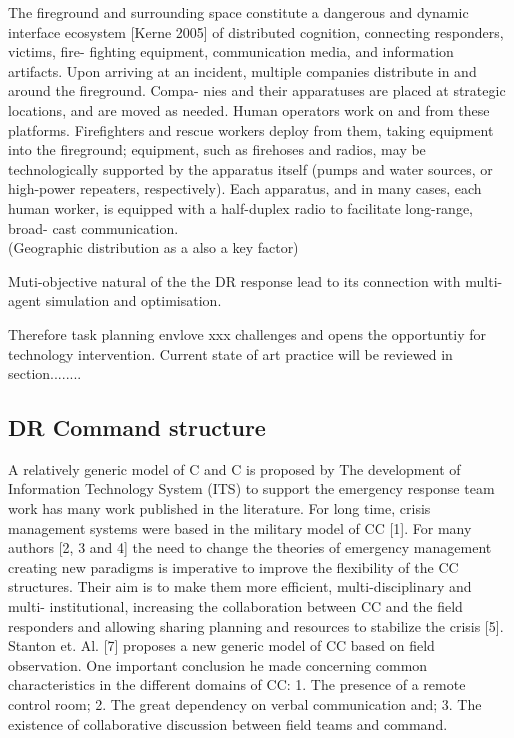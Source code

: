 The fireground and surrounding space constitute a dangerous and dynamic interface ecosystem [Kerne 2005] of distributed cognition, connecting responders, victims, fire- fighting equipment, communication media, and information artifacts. Upon arriving at an incident, multiple companies distribute in and around the fireground. Compa- nies and their apparatuses are placed at strategic locations, and are moved as needed. Human operators work on and from these platforms. Firefighters and rescue workers deploy from them, taking equipment into the fireground; equipment, such as firehoses and radios, may be technologically supported by the apparatus itself (pumps and water sources, or high-power repeaters, respectively). Each apparatus, and in many cases, each human worker, is equipped with a half-duplex radio to facilitate long-range, broad- cast communication.\\

(Geographic distribution as a also a key factor)

\noindent Muti-objective natural of the the DR response lead to its connection with multi-agent simulation and optimisation. 

Therefore task planning envlove xxx challenges and opens the opportuntiy for technology intervention. Current state of art practice will be reviewed in section........\\

\subsection{DR Command structure}


A relatively generic model of C and C is proposed by 
The development of Information Technology System (ITS)
to support the emergency response team work has many work published in the literature. For long time, crisis management systems were based in the military model of CC [1]. For many authors [2, 3 and 4] the need to change the theories of emergency management creating new paradigms is imperative to improve the flexibility of the CC structures. Their aim is to make them more
efficient, multi-disciplinary and multi-
institutional, increasing the collaboration between CC and the field responders and allowing sharing planning and resources to stabilize the crisis [5].
Stanton et. Al. [7] proposes a new generic model of CC
based on field observation. One important conclusion he made concerning common characteristics in the different domains of CC:
1. The presence of a remote control room; 2. The great dependency on verbal communication and;
3. The existence of collaborative discussion between field teams and command.\\


